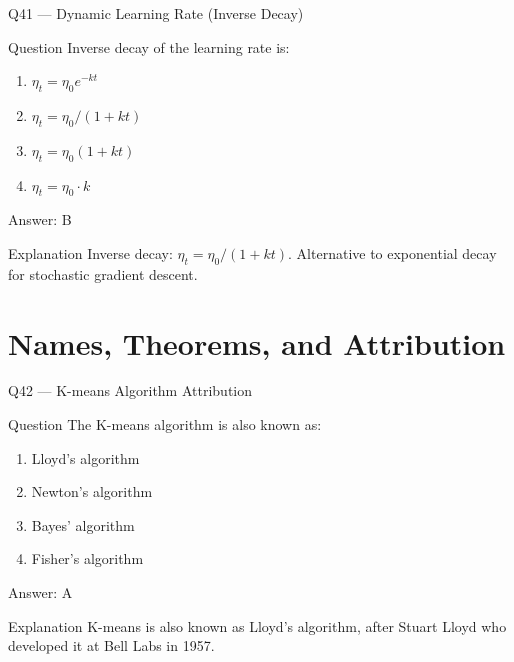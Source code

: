 \documentclass[aspectratio=169,8pt]{beamer}
\begin{document}
	\begin{frame}{Q41 --- Dynamic Learning Rate (Inverse Decay)}
		\begin{block}{Question}
			Inverse decay of the learning rate is:
			\begin{enumerate}
				\item $\eta_t = \eta_0 e^{-kt}$
				\item $\eta_t = \eta_0 / (1 + kt)$
				\item $\eta_t = \eta_0 (1 + kt)$
				\item $\eta_t = \eta_0 \cdot k$
			\end{enumerate}
		\end{block}
		\begin{exampleblock}{Answer: B}\end{exampleblock}
		\begin{block}{Explanation}
			Inverse decay: $\eta_t = \eta_0/(1+kt)$. Alternative to exponential decay for stochastic gradient descent.
		\end{block}
	\end{frame}
	
	\section{Names, Theorems, and Attribution}
	
	\begin{frame}{Q42 --- K-means Algorithm Attribution}
		\begin{block}{Question}
			The K-means algorithm is also known as:
			\begin{enumerate}
				\item Lloyd's algorithm
				\item Newton's algorithm
				\item Bayes' algorithm
				\item Fisher's algorithm
			\end{enumerate}
		\end{block}
		\begin{exampleblock}{Answer: A}\end{exampleblock}
		\begin{block}{Explanation}
			K-means is also known as Lloyd's algorithm, after Stuart Lloyd who developed it at Bell Labs in 1957.
		\end{block}
	\end{frame}
	
\end{document}
